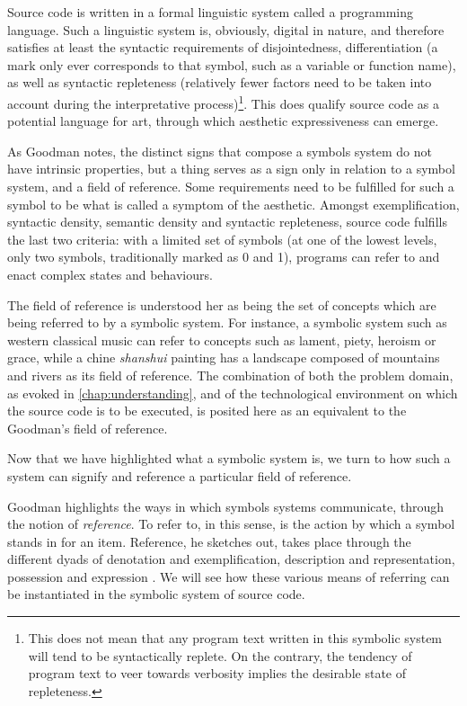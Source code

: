 Source code is written in a formal linguistic system called a programming language. Such a linguistic system is, obviously, digital in nature, and therefore satisfies at least the syntactic requirements of disjointedness, differentiation (a mark only ever corresponds to that symbol, such as a variable or function name), as well as syntactic repleteness (relatively fewer factors need to be taken into account during the interpretative process)\footnote{This does not mean that any program text written in this symbolic system will tend to be syntactically replete. On the contrary, the tendency of program text to veer towards verbosity implies the desirable state of repleteness.}. This does qualify source code as a potential language for art, through which aesthetic expressiveness can emerge.

As Goodman notes, the distinct signs that compose a symbols system do not have intrinsic properties, but a thing serves as a sign only in relation to a symbol system, and a field of reference. Some requirements need to be fulfilled for such a symbol to be what is called a symptom of the aesthetic. Amongst exemplification, syntactic density, semantic density and syntactic repleteness, source code fulfills the last two criteria: with a limited set of symbols (at one of the lowest levels, only two symbols, traditionally marked as 0 and 1), programs can refer to and enact complex states and behaviours.

The field of reference is understood her as being the set of concepts which are being referred to by a symbolic system. For instance, a symbolic system such as western classical music can refer to concepts such as lament, piety, heroism or grace, while a chine \emph{shanshui} painting has a landscape composed of mountains and rivers as its field of reference. The combination of both the problem domain, as evoked in \ref{chap:understanding}, and of the technological environment on which the source code is to be executed, is posited here as an equivalent to the Goodman's field of reference.

Now that we have highlighted what a symbolic system is, we turn to how such a system can signify and reference a particular field of reference.

Goodman highlights the ways in which symbols systems communicate, through the notion of \emph{reference}. To refer to, in this sense, is the action by which a symbol stands in for an item. Reference, he sketches out, takes place through the different dyads of denotation and exemplification, description and representation, possession and expression \citep{goodman_languages_1976}. We will see how these various means of referring can be instantiated in the symbolic system of source code. 

